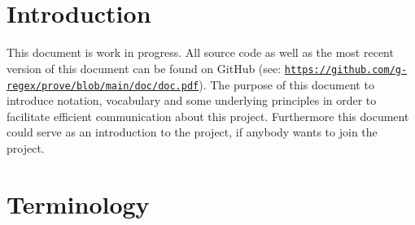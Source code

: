 \documentclass[british]{article}
\title{\name\ }
\begin{document}
\maketitle

\section{Introduction}

This document is work in progress. All source code as well as the most recent
version of this document can be found on GitHub (see:
\href{https://github.com/g-regex/prove/blob/main/doc/doc.pdf}%
{\texttt{https://github.com/g-regex/prove/blob/main/doc/doc.pdf}}). The purpose
of this document to introduce notation, vocabulary and some underlying
principles in order to facilitate efficient communication about this project.
Furthermore this document could serve as an introduction to the project, if
anybody wants to join the project.

\pagebreak{}

\section{Terminology}
\end{document}
